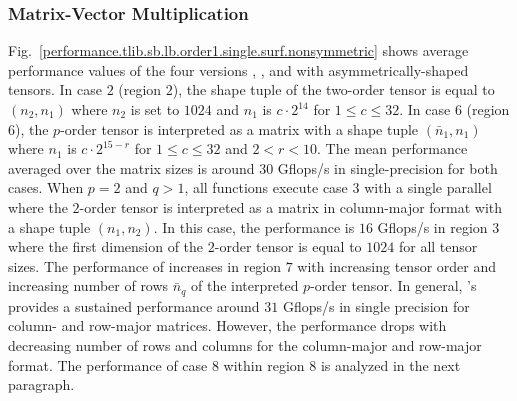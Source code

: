 

\subsubsection{Matrix-Vector Multiplication}
Fig.~\ref{performance.tlib.sb.lb.order1.single.surf.nonsymmetric} shows average performance values of the four versions , ,  and  with asymmetrically-shaped tensors.
In case $2$ (region $2$), the shape tuple of the two-order tensor is equal to $(n_2,n_1)$ where $n_2$ is set to $1024$ and $n_1$ is $c \cdot 2^{14}$ for $1 \leq c \leq 32$. %
In case $6$ (region $6$), the $p$-order tensor is interpreted as a matrix with a shape tuple $(\bar{n}_1,n_1)$ where $n_1$ is $c \cdot 2^{15-r}$ for $1 \leq c \leq 32$ and $2 < r < 10$.
The mean performance averaged over the matrix sizes is around $30$ Gflops/s in single-precision for both cases.
When $p=2$ and $q>1$, all functions execute case $3$ with a single parallel  where the $2$-order tensor is interpreted as a matrix in column-major format with a shape tuple $(n_1,n_2)$.
In this case, the performance is $16$ Gflops/s in region $3$ where the first dimension of the $2$-order tensor is equal to $1024$ for all tensor sizes.
The performance of  increases in region $7$ with increasing tensor order and increasing number of rows $\bar{n}_q$ of the interpreted $p$-order tensor.
In general, 's  provides a sustained performance around $31$ Gflops/s in single precision for column- and row-major matrices.
However, the performance drops with decreasing number of rows and columns for the column-major and row-major format.
The performance of case $8$ within region $8$ is analyzed in the next paragraph.


